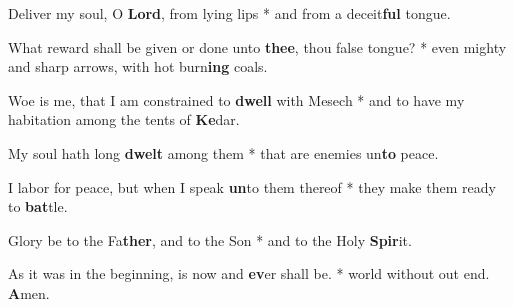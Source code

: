 \begin{multicols}{2}
	Deliver my soul, O \textbf{Lord}, from lying lips * and from a deceit\textbf{ful} tongue.
	
	What reward shall be given or done unto \textbf{thee}, thou false tongue? * even mighty and sharp arrows, with hot burn\textbf{ing} coals.
	
	Woe is me, that I am constrained to \textbf{dwell} with Mesech * and to have my habitation among the tents of \textbf{Ke}dar.
	
	My soul hath long \textbf{dwelt} among them * that are enemies un\textbf{to} peace.
	
	I labor for peace, but when I speak \textbf{un}to them thereof * they make them ready to \textbf{bat}tle.
	
	Glory be to the Fa\textbf{ther}, and to the Son * and to the Holy \textbf{Spir}it.
	
	As it was in the beginning, is now and \textbf{ev}er shall be. * world without out end. \textbf{A}men.
\end{multicols}
